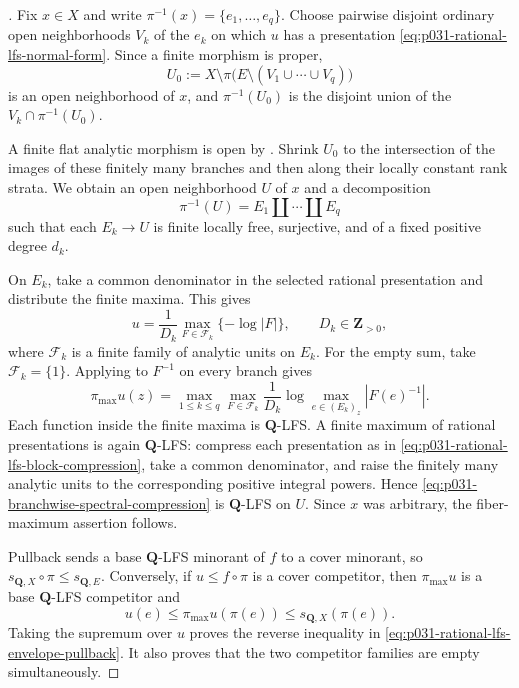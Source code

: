 \begin{proof}[]
Fix $x\in X$ and write $\pi^{-1}(x)=\{e_1,\ldots,e_q\}$.  Choose pairwise
disjoint ordinary open neighborhoods $V_k$ of the $e_k$ on which $u$ has
a presentation \eqref{eq:p031-rational-lfs-normal-form}.  Since a finite
morphism is proper,
\[
 U_0:=X\setminus\pi\bigl(E\setminus(V_1\cup\cdots\cup V_q)\bigr)
\]
is an open neighborhood of $x$, and $\pi^{-1}(U_0)$ is the disjoint union
of the $V_k\cap\pi^{-1}(U_0)$.

A finite flat analytic morphism is open by
\cite[proof of Proposition~5.11, p.~175]{GJR26}.  Shrink $U_0$ to the
intersection of the images of these finitely many branches and then along
their locally constant rank strata.  We obtain an open neighborhood $U$ of
$x$ and a decomposition
\begin{equation}
\label{eq:p031-local-finite-flat-branch-decomposition}
                 \pi^{-1}(U)=E_1\amalg\cdots\amalg E_q
\end{equation}
such that each $E_k\to U$ is finite locally free, surjective, and of a
fixed positive degree $d_k$.

On $E_k$, take a common denominator in the selected rational presentation
and distribute the finite maxima.  This gives
\begin{equation}
\label{eq:p031-rational-lfs-block-compression}
 u=\frac1{D_k}\max_{F\in\mathcal F_k}\{-\log|F|\},
 \qquad D_k\in\mathbf Z_{>0},
\end{equation}
where $\mathcal F_k$ is a finite family of analytic units on $E_k$.  For
the empty sum, take $\mathcal F_k=\{1\}$.  Applying
 to $F^{-1}$ on every
branch gives
\begin{equation}
\label{eq:p031-branchwise-spectral-compression}
 \pi_{\max}u(z)
  =\max_{1\leq k\leq q}\max_{F\in\mathcal F_k}
      \frac1{D_k}
      \log\max_{e\in(E_k)_z}|F(e)^{-1}|.
\end{equation}
Each function inside the finite maxima is $\mathbf Q$-LFS.  A finite
maximum of rational presentations is again $\mathbf Q$-LFS: compress each
presentation as in \eqref{eq:p031-rational-lfs-block-compression}, take a
common denominator, and raise the finitely many analytic units to the
corresponding positive integral powers.  Hence
\eqref{eq:p031-branchwise-spectral-compression} is $\mathbf Q$-LFS on
$U$.  Since $x$ was arbitrary, the fiber-maximum assertion follows.

Pullback sends a base $\mathbf Q$-LFS minorant of $f$ to a cover minorant,
so $s_{\mathbf Q,X}\circ\pi\leq s_{\mathbf Q,E}$.  Conversely, if
$u\leq f\circ\pi$ is a cover competitor, then $\pi_{\max}u$ is a base
$\mathbf Q$-LFS competitor and
\[
 u(e)\leq\pi_{\max}u(\pi(e))
       \leq s_{\mathbf Q,X}(\pi(e)).
\]
Taking the supremum over $u$ proves the reverse inequality in
\eqref{eq:p031-rational-lfs-envelope-pullback}.  It also proves that the
two competitor families are empty simultaneously.
\end{proof}


